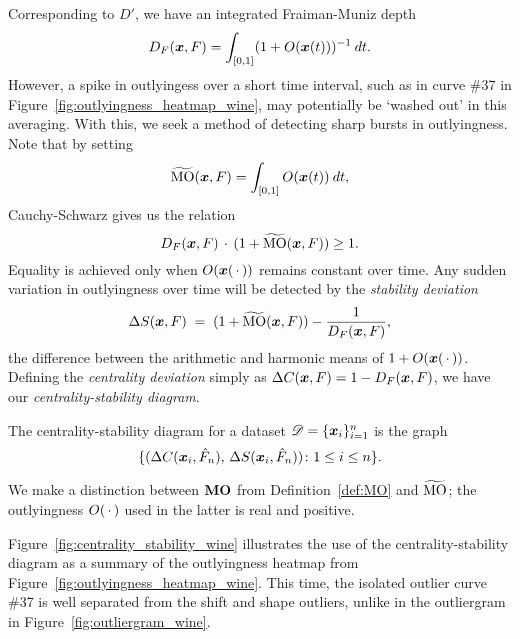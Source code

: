 Corresponding to $D'$, we have an integrated Fraiman-Muniz depth
\begin{equation}
    D_F(\bm{x}, F) = \int_{[0, 1]} (1 + O(\bm{x}(t)))^{-1}\:dt.
\end{equation}
However, a spike in outlyingess over a short time interval, such as in curve
\#37 in Figure~\ref{fig:outlyingness_heatmap_wine}, may potentially be `washed
out' in this averaging.
With this, we seek a method of detecting sharp bursts in outlyingness.
Note that by setting
\begin{equation}
    \widetilde{\MOt}(\vx, F) = \int_{[0, 1]} O(\vx(t)) \:dt,%
\end{equation}
Cauchy-Schwarz gives us the relation
\begin{equation}
    D_F(\bm{x}, F) \,\cdot\, (1 + \widetilde{\operatorname{MO}}(\bm{x}, F)) \geq 1.
\end{equation}
Equality is achieved only when $O(\bm{x}(\,\cdot\,))$ remains constant over time.
Any sudden variation in outlyingness over time will be detected by the
\emph{stability deviation}
\begin{equation}
    \Delta S(\bm{x}, F) \;=\; (1 + \widetilde{\operatorname{MO}}(\bm{x}, F)) - \frac{1}{D_F(\bm{x}, F)},
\end{equation}
the difference between the arithmetic and harmonic means of $1 +
O(\bm{x}(\,\cdot\,))$.
Defining the \emph{centrality deviation} simply as $\Delta C(\bm{x}, F) = 1 -
D_F(\bm{x}, F)$, we have our \emph{centrality-stability diagram}.

\begin{definition}
    The centrality-stability diagram for a dataset $\mathscr{D} = \{\bm{x}_i\}_{i
    = 1}^n$ is the graph
    \begin{equation}
        \{(\Delta C(\bm{x}_i, \hat{F}_n),\, \Delta S(\bm{x}_i, \hat{F}_n))\colon 1 \leq i \leq n\}.
    \end{equation}
\end{definition}

\begin{remark}
    We make a distinction between $\operatorname{\textbf{MO}}$ from Definition~\ref{def:MO} and
    $\widetilde{\operatorname{MO}}$; the outlyingness $O(\,\cdot\,)$ used in the latter is real
    and positive.
\end{remark}

Figure~\ref{fig:centrality_stability_wine} illustrates the use of the
centrality-stability diagram as a summary of the outlyingness heatmap from
Figure~\ref{fig:outlyingness_heatmap_wine}.
This time, the isolated outlier curve \#37 is well separated from the shift
and shape outliers, unlike in the outliergram in
Figure~\ref{fig:outliergram_wine}.




